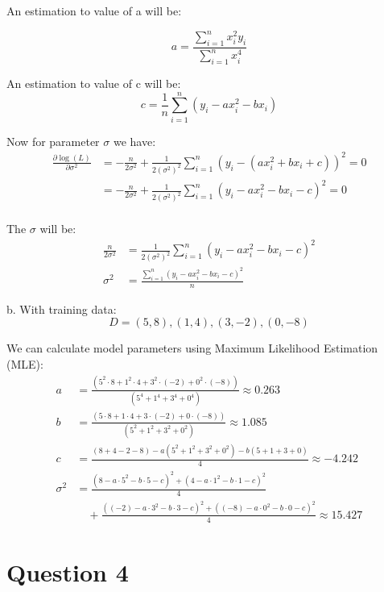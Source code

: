 \documentclass{article}
\begin{document}
An estimation to value of a will be:

\[
a = \frac{\sum_{i=1}^n x_i^2y_i}{\sum_{i=1}^n x_i^4}
\]

An estimation to value of c will be:
\[
c = \frac{1}{n}\sum_{i=1}^n (y_i - ax_i^2 - bx_i)
\]


Now for parameter $\sigma$ we have:
\[
\begin{aligned}
\frac{\partial \log(L)}{\partial \sigma^2} &= -\frac{n}{2\sigma^2} + \frac{1}{2(\sigma^2)^2} \sum_{i=1}^n (y_i - (ax_i^2 + bx_i + c))^2 = 0 \\
&= -\frac{n}{2\sigma^2} + \frac{1}{2(\sigma^2)^2} \sum_{i=1}^n (y_i - ax_i^2 - bx_i - c)^2 = 0 \\
\end{aligned}
\]

The $\sigma$ will be:
\[
\begin{aligned}
\frac{n}{2\sigma^2} &= \frac{1}{2(\sigma^2)^2} \sum_{i=1}^n (y_i - ax_i^2 - bx_i - c)^2 \\
\sigma^2 &= \frac{\sum_{i=1}^n (y_i - ax_i^2 - bx_i - c)^2}{n}
\end{aligned}
\]

\pagebreak

b. With training data:
$$D = {(5, 8), (1, 4), (3, -2), (0, -8)}$$

We can calculate model parameters using Maximum Likelihood Estimation (MLE):
\[
\begin{aligned}
a & = \frac{(5^2 \cdot 8 + 1^2 \cdot 4 + 3^2 \cdot (-2) + 0^2 \cdot (-8))}{(5^4 + 1^4 + 3^4 + 0^4)} \approx 0.263\\
b & = \frac{(5 \cdot 8 + 1 \cdot 4 + 3 \cdot (-2) + 0 \cdot (-8))}{(5^2 + 1^2 + 3^2 + 0^2)} \approx 1.085\\
c & = \frac{(8 + 4 - 2 - 8) - a(5^2 + 1^2 + 3^2 + 0^2) - b(5 + 1 + 3 + 0)}{4} \approx -4.242\\
\sigma^2 & = \frac{(8 - a \cdot 5^2 - b \cdot 5 - c)^2 + (4 - a \cdot 1^2 - b \cdot 1 - c)^2}{4} \\
& \quad + \frac{((-2) - a \cdot 3^2 - b \cdot 3 - c)^2 + ((-8) - a \cdot 0^2 - b \cdot 0 - c)^2}{4} \approx 15.427
\end{aligned}
\]



\pagebreak

\section{Question 4}
\end{document}
